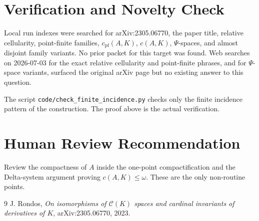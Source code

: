 \documentclass[11pt]{article}
\begin{document}
\section*{Verification and Novelty Check}

Local run indexes were searched for arXiv:2305.06770, the paper title,
relative cellularity, point-finite families, $c_{\mathrm{pf}}(A,K)$,
$c(A,K)$, $\Psi$-spaces, and almost disjoint family variants.  No prior packet
for this target was found.  Web searches on 2026-07-03 for the exact relative
cellularity and point-finite phrases, and for $\Psi$-space variants, surfaced
the original arXiv page but no existing answer to this question.

The script \texttt{code/check\_finite\_incidence.py} checks only the finite
incidence pattern of the construction.  The proof above is the actual
verification.

\section*{Human Review Recommendation}

Review the compactness of $A$ inside the one-point compactification and the
Delta-system argument proving $c(A,K)\le\omega$.  These are the only
non-routine points.

\begin{thebibliography}{9}
J. Rondos,
\emph{On isomorphisms of $\mathcal C(K)$ spaces and cardinal invariants of
derivatives of $K$},
arXiv:2305.06770, 2023.
\end{thebibliography}
\end{document}
